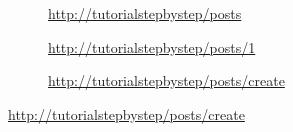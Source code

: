 \documentclass[internal]{nhitec_design}
\begin{document}
\begin{figure}[!h]
    \begin{subfigure}[c]{0.73\textwidth}
    \end{subfigure}\hfill
    \begin{subfigure}[c]{0.24\textwidth}
        \caption{\url{http://tutorialstepbystep/posts}} 
    \end{subfigure}
    \begin{subfigure}[c]{0.73\textwidth}
    \end{subfigure}\hfill
    \begin{subfigure}[c]{0.24\textwidth}
        \caption{\url{http://tutorialstepbystep/posts/1}} 
    \end{subfigure}
    \begin{subfigure}[c]{0.73\textwidth}
    \end{subfigure}\hfill
    \begin{subfigure}[c]{0.24\textwidth}
        \caption{\url{http://tutorialstepbystep/posts/create}} 

\end{subfigure}
\end{figure}
\end{document}
